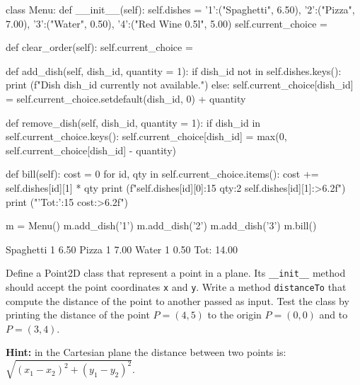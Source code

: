 \cprotEnv\begin{solution}
\begin{ipython}
class Menu:
    def __init__(self):
        self.dishes = {'1':("Spaghetti", 6.50), '2':("Pizza", 7.00), '3':("Water", 0.50),
                       '4':("Red Wine 0.5l", 5.00)}
        self.current_choice = {}
        
    def clear_order(self):
        self.current_choice = {}
        
    def add_dish(self, dish_id, quantity = 1):
        if dish_id not in self.dishes.keys():
            print (f"Dish {dish_id} currently not available.")
        else:
            self.current_choice[dish_id] = 
                self.current_choice.setdefault(dish_id, 0) + quantity
            
    def remove_dish(self, dish_id, quantity = 1):
        if dish_id in self.current_choice.keys():
            self.current_choice[dish_id] = max(0, self.current_choice[dish_id] - quantity)
            
    def bill(self):
        cost = 0
        for id, qty in self.current_choice.items():
            cost += self.dishes[id][1] * qty
            print (f"{self.dishes[id][0]:15} {qty:2} {self.dishes[id][1]:>6.2f}")
        print ("{'Tot:':15}    {cost:>6.2f}")

m = Menu()
m.add_dish('1')
m.add_dish('2')
m.add_dish('3')
m.bill()
\end{ipython}
\begin{ioutput}
Spaghetti        1   6.50
Pizza            1   7.00
Water            1   0.50
Tot:                14.00
\end{ioutput}
\end{solution}

\begin{question}
Define a Point2D class that represent a point in a plane. Its \texttt{\_\_init\_\_} method should accept the point coordinates \texttt{x} and \texttt{y}. Write a method \texttt{distanceTo} that compute the distance of the point to another passed as input. Test the class by printing the distance of the point $P=(4, 5)$ to the origin $P=(0,0)$ and to $P=(3,4)$.

\noindent\textbf{Hint:} in the Cartesian plane the distance between two points is: $\sqrt{(x_1 - x_2)^2 + (y_1 - y_2)^2}$.
\end{question}

